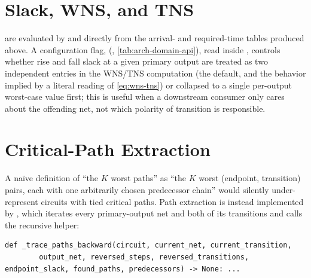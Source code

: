 \section{Slack, WNS, and TNS}
\label{sec:sta-slack}

 are evaluated by
 and
 directly from the arrival- and
required-time tables produced above. A configuration flag,
(, \cref{tab:arch-domain-api}), read inside
, controls whether rise and fall slack at a given
primary output are treated as two independent entries in the WNS/TNS
computation (the default, and the behavior implied by a literal reading of
\cref{eq:wns-tns}) or collapsed to a single per-output worst-case value
first; this is useful when a downstream consumer only cares
about the offending net, not which polarity of transition is responsible.

\section{Critical-Path Extraction}
\label{sec:sta-paths}

A na\"ive definition of ``the $K$ worst paths'' as ``the $K$ worst
(endpoint, transition) pairs, each with one arbitrarily chosen predecessor
chain'' would silently under-represent circuits with tied critical paths.
Path extraction is instead implemented by ,
which iterates every primary-output net and both of its transitions and
calls the recursive helper:

\begin{lstlisting}[style=pythonstyle, numbers=none]
def _trace_paths_backward(circuit, current_net, current_transition,
        output_net, reversed_steps, reversed_transitions, endpoint_slack, found_paths, predecessors) -> None: ...
\end{lstlisting}

